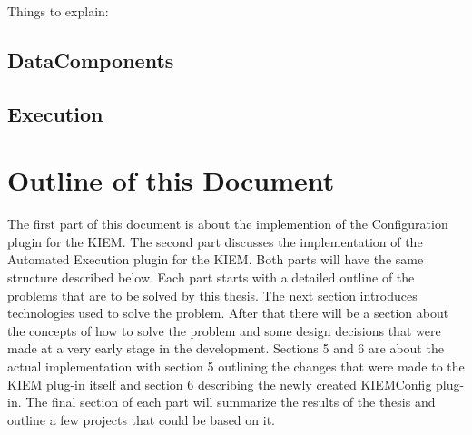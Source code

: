 Things to explain:
\subsection{DataComponents}
\label{section:IntroDataComponent}

\subsection{Execution}
\label{section:IntroExecution}



\section{Outline of this Document}
\label{sec:intro/Outline}
The first part of this document is about the implemention of the Configuration plugin for the \ac{KIEM}.
The second part discusses the implementation of the Automated Execution plugin for the \ac{KIEM}. Both
parts will have the same structure described below.
Each part starts with a detailed outline of the problems that are to be solved by this thesis.
The next section introduces technologies used to solve the problem.
After that there will be a section about the concepts of how to solve the problem and some
design decisions that were made at a very early stage in the development.
Sections 5 and 6 are about the actual implementation with section 5 outlining the changes
that were made to the \ac{KIEM} plug-in itself and section 6 describing the newly created
\ac{KIEMConfig} plug-in.
The final section of each part will summarize the results of the thesis and outline
a few projects that could be based on it.








